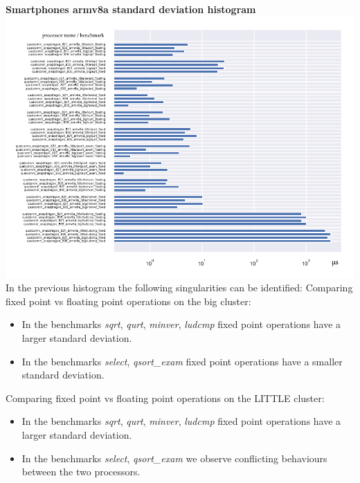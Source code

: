 \clearpage
\textbf{Smartphones armv8a standard deviation histogram}\newline
\hspace*{-3.2cm}
\includegraphics[width=570pt]{smartphones_stddev_histogram.pdf}\\[4cm]
In the previous histogram the following singularities can be identified:
Comparing fixed point vs floating point operations on the big cluster:
\begin{itemize}
		\item In the benchmarks \textit{sqrt}, \textit{qurt}, \textit{minver}, \textit{ludcmp} fixed point operations have a larger standard deviation.
		\item In the benchmarks \textit{select}, \textit{qsort\_exam} fixed point operations have a smaller standard deviation.
\end{itemize}
Comparing fixed point vs floating point operations on the LITTLE cluster:
\begin{itemize}
		\item In the benchmarks \textit{sqrt}, \textit{qurt}, \textit{minver}, \textit{ludcmp} fixed point operations have a larger standard deviation.
		\item In the benchmarks \textit{select}, \textit{qsort\_exam} we observe conflicting behaviours between the two processors.
\end{itemize}

